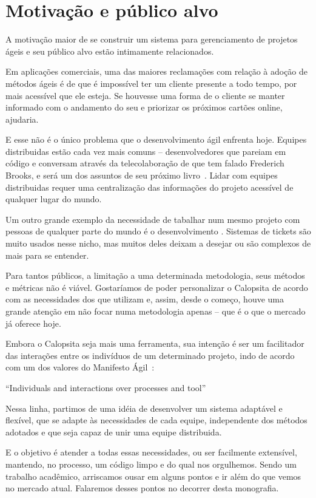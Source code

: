 \section{Motivação e público alvo}

A motivação maior de se construir um sistema para gerenciamento de projetos ágeis e seu público alvo estão intimamente relacionados. 

Em aplicações comerciais, uma das maiores reclamações com relação à adoção de métodos ágeis é de que é impossível ter um cliente presente a todo tempo, por mais acessível que ele esteja. Se houvesse uma forma de o cliente se manter informado com o andamento do seu \software e priorizar os próximos cartões online, ajudaria.

E esse não é o único problema que o desenvolvimento ágil enfrenta hoje. Equipes distribuidas estão cada vez mais comuns -- desenvolvedores que pareiam em código e conversam através da telecolaboração de que tem falado Frederich Brooks, e será um dos assuntos de seu próximo livro~\cite{brooks}. Lidar com equipes distribuidas requer uma centralização das informações do projeto acessível de qualquer lugar do mundo.

Um outro grande exemplo da necessidade de tabalhar num mesmo projeto com pessoas de qualquer parte do mundo é o desenvolvimento \opensource. Sistemas de tickets são muito usados nesse nicho, mas muitos deles deixam a desejar ou são complexos de mais para se entender.

Para tantos públicos, a limitação a uma determinada metodologia, seus métodos e métricas não é viável. Gostaríamos de poder personalizar o Calopsita de acordo com as necessidades dos que utilizam e, assim, desde o começo, houve uma grande atenção em não focar numa metodologia apenas -- que é o que o mercado já oferece hoje.

Embora o Calopsita seja mais uma ferramenta, sua intenção é ser um facilitador das interações entre os indivíduos de um determinado projeto, indo de acordo com um dos valores do Manifesto Ágil~\cite{manifesto}:

``Individuals and interactions over processes and tool''

Nessa linha, partimos de uma idéia de desenvolver um sistema adaptável e flexível, que se adapte às necessidades de cada equipe, independente dos métodos adotados e que seja capaz de unir uma equipe distribuida.

E o objetivo é atender a todas essas necessidades, ou ser facilmente extensível, mantendo, no processo, um código limpo e do qual nos orgulhemos. Sendo um trabalho acadêmico, arriscamos ousar em alguns pontos e ir além do que vemos no mercado atual. Falaremos desses pontos no decorrer desta monografia.
